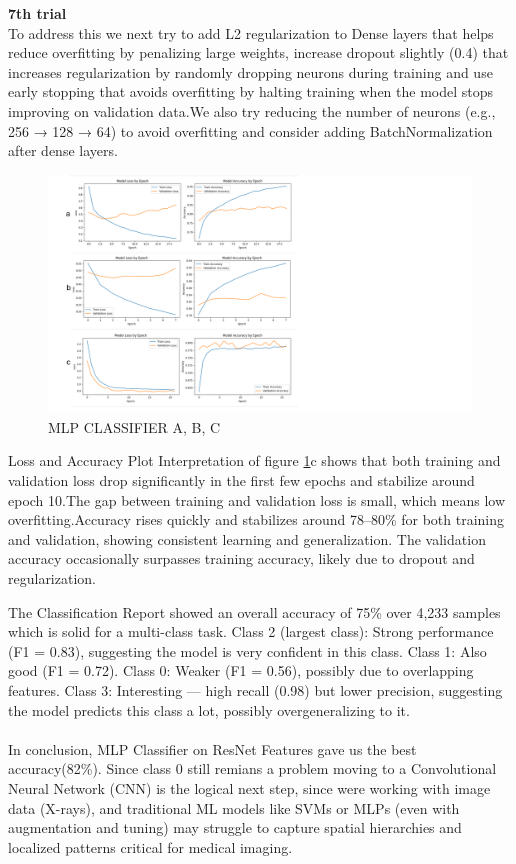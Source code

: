 \documentclass{article}
\begin{document}
\textbf{7th trial}\\
To address this we next try to add L2 regularization to Dense layers that helps reduce overfitting by penalizing large weights, increase dropout slightly (0.4) that increases regularization by randomly dropping neurons during training and use early stopping that avoids overfitting by halting training when the model stops improving on validation data.We also try reducing the number of neurons (e.g., 256 → 128 → 64) to avoid overfitting and consider adding BatchNormalization after dense layers.
\begin{figure}[ht] %
    \centering
    \includegraphics[width=1.0\linewidth]{comparemlp2.png}
    \caption{MLP CLASSIFIER A, B, C}
    \label{fig:MLP_CLASSIFIER_compare}
\end{figure}
Loss and Accuracy Plot Interpretation of figure \ref{fig:MLP_CLASSIFIER_compare}c shows that both training and validation loss drop significantly in the first few epochs and stabilize around epoch 10.The gap between training and validation loss is small, which means low overfitting.Accuracy rises quickly and stabilizes around 78–80\% for both training and validation, showing consistent learning and generalization.
The validation accuracy occasionally surpasses training accuracy, likely due to dropout and regularization.

The Classification Report showed an overall accuracy of 75\% over 4,233 samples which is solid for a multi-class task.
Class 2 (largest class): Strong performance (F1 = 0.83), suggesting the model is very confident in this class.
Class 1: Also good (F1 = 0.72).
Class 0: Weaker (F1 = 0.56), possibly due to overlapping features.
Class 3: Interesting — high recall (0.98) but lower precision, suggesting the model predicts this class a lot, possibly overgeneralizing to it.\\
\\
In conclusion, MLP Classifier on ResNet Features gave us the best accuracy(82\%). Since class 0 still remians a problem moving to a Convolutional Neural Network (CNN) is the logical next step, since were working with image data (X-rays), and traditional ML models like SVMs or MLPs (even with augmentation and tuning) may struggle to capture spatial hierarchies and localized patterns critical for medical imaging.\\
\end{document}
